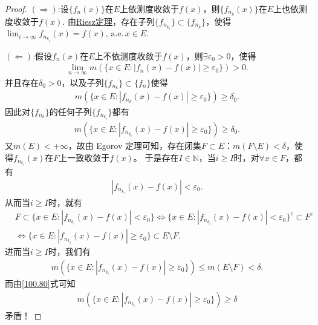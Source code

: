 \documentclass[../../main.tex]{subfiles}
\begin{document}
\begin{proof}
\((\Rightarrow)\):设$\{f_n(x)\}$在$E$上依测度收敛于$f(x)$，则$\{f_{n_k}(x)\}$在$E$上也依测度收敛于$f(x)$. 由\hyperref[theorem:Riesz定理]{Riesz定理}，存在子列\(\{f_{n_{k_i}}\} \subset \{f_{n_k}\}\)，使得$\lim_{i\to \infty}f_{n_{k_i}}(x)= f(x),\,\text{a.e.}\,x\in E.$

\((\Leftarrow)\):假设\(f_n(x)\)在\(E\)上不依测度收敛于\(f(x)\)，则\(\exists \varepsilon_0 > 0\)，使得
\begin{align*}
\underset{n\rightarrow \infty}{\lim}m(\{x\in E:|f_n(x)-f(x)|\geqslant \varepsilon _0\})>0.
\end{align*}
并且存在\(\delta_0 > 0\)，以及子列\(\{f_{n_k}\} \subset \{f_n\}\)使得
\begin{align*}
m(\{x \in E : |f_{n_k}(x) - f(x)| \geqslant \varepsilon_0\}) \geqslant \delta_0.
\end{align*}
因此对\(\{f_{n_k}\}\)的任何子列$\{f_{n_{k_i}}\}$都有
\begin{align}
m(\{x \in E : |f_{n_{k_i}}(x) - f(x)| \geqslant \varepsilon_0\}) \geqslant \delta_0.\label{100.80}
\end{align}
又\(m(E) < +\infty\)，故由 Egorov 定理可知，存在闭集\(F \subset E\)：\(m(F \setminus E) < \delta\)，使得\(f_{n_{k_i}}(x)\)在\(F\)上一致收敛于\(f(x)\)。
于是存在\(I \in \mathbb{N}\)，当\(i \geqslant I\)时，对\(\forall x \in F\)，都有
\begin{align*}
|f_{n_{k_i}}(x) - f(x)| < \varepsilon_0.
\end{align*}
从而当\(i \geqslant I\)时，就有
\begin{align*}
&F \subset \{x \in E : |f_{n_{k_i}}(x) - f(x)| < \varepsilon_0\} \Longleftrightarrow \{x \in E : |f_{n_{k_i}}(x) - f(x)| < \varepsilon_0\}^c \subset F^c \\
&\Longleftrightarrow \{x \in E : |f_{n_{k_i}}(x) - f(x)| \geqslant \varepsilon_0\} \subset E \setminus F.
\end{align*}
进而当\(i \geqslant I\)时，我们有
\begin{align*}
m(\{x \in E : |f_{n_{k_i}}(x) - f(x)| \geqslant \varepsilon_0\}) \leqslant m(E \setminus F) < \delta.
\end{align*}
而由\eqref{100.80}式可知
\begin{align*}
m(\{x \in E : |f_{n_{k_i}}(x) - f(x)| \geqslant \varepsilon_0\}) \geqslant \delta
\end{align*}
矛盾！

\end{proof}
\end{document}
